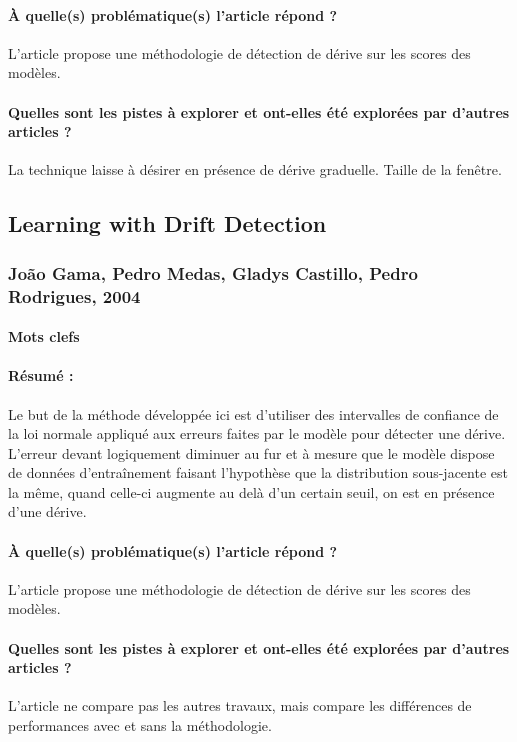 \documentclass[11pt,a4paper]{report}
\begin{document}
\paragraph{À quelle(s) problématique(s) l'article répond ?} L'article propose une méthodologie de détection de dérive sur les scores des modèles.

\paragraph{Quelles sont les pistes à explorer et ont-elles été explorées par d'autres articles ?} La technique laisse à désirer en présence de dérive graduelle. Taille de la fenêtre.




\subsection{Learning with Drift Detection}
\subsubsection{João Gama, Pedro Medas, Gladys Castillo, Pedro Rodrigues, 2004}

\paragraph{Mots clefs}

\paragraph{Résumé :} Le but de la méthode développée ici est d'utiliser des intervalles de confiance de la loi normale appliqué aux erreurs faites par le modèle pour détecter une dérive. L'erreur devant logiquement diminuer au fur et à mesure que le modèle dispose de données d'entraînement faisant l'hypothèse que la distribution sous-jacente est la même, quand celle-ci augmente au delà d'un certain seuil, on est en présence d'une dérive.

\paragraph{À quelle(s) problématique(s) l'article répond ?} L'article propose une méthodologie de détection de dérive sur les scores des modèles.

\paragraph{Quelles sont les pistes à explorer et ont-elles  été explorées par d'autres articles ?} L'article ne compare pas les autres travaux, mais compare les différences de performances avec et sans la méthodologie.
\end{document}
